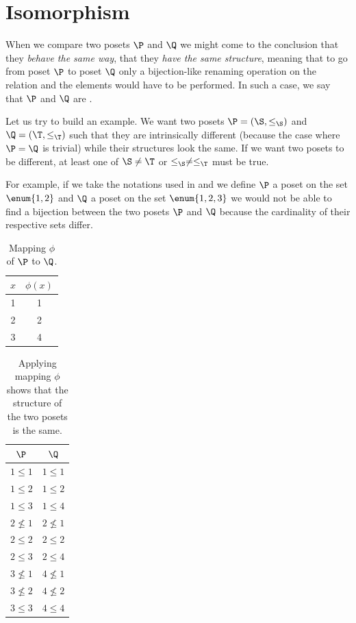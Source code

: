 \section{Isomorphism}

When we compare two posets $\P$ and $\Q$ we might come to the conclusion that
they \emph{behave the same way}, that they \emph{have the same structure},
meaning that to go from poset $\P$ to poset $\Q$ only a bijection-like renaming
operation on the relation and the elements would have to be performed. In such
a case, we say that $\P$ and $\Q$ are .

Let us try to build an example. We want two posets $\P = (\S, \le_{\S})$ and $\Q =
(\T, \le_{\T})$ such that they are intrinsically different (because the case where
$\P = \Q$ is trivial) while their structures look the same. If we want two posets
to be different, at least one of $\S \neq \T$ or $\le_{\S} \neq \le_{\T}$ must be true.

For example, if we take the notations used in  and we
define $\P$ a poset on the set $\enum{1, 2}$ and $\Q$ a poset on the set $\enum{1, 2, 3}$
we would not be able to find a bijection between the two posets $\P$ and $\Q$
because the cardinality of their respective sets differ.

\begin{table}
\centering
\caption{Mapping $\phi$ of $\P$ to $\Q$.}
\label{table:poset:iso:a}
\begin{tabular}{c|c}
	$x$ & $\phi(x)$ \\
	\hline
	1 & 1 \\
	2 & 2 \\
	3 & 4 \\
\end{tabular}
\end{table}

\begin{table}
\centering
\caption{Applying mapping $\phi$ shows that the structure of the two posets is
the same.}
\label{table:poset:iso:b}
\begin{tabular}{c|c}
	$\P$ & $\Q$\\
	\hline
	$1 \le 1$   & $1 \le 1$\\
	$1 \le 2$   & $1 \le 2$\\
	$1 \le 3$   & $1 \le 4$\\
	$2 \nleq 1$ & $2 \nleq 1$\\
	$2 \le 2$   & $2 \le 2$\\
	$2 \le 3$   & $2 \le 4$\\
	$3 \nleq 1$ & $4 \nleq 1$\\
	$3 \nleq 2$ & $4 \nleq 2$\\
	$3 \le 3$   & $4 \le 4$\\
\end{tabular}
\end{table}

